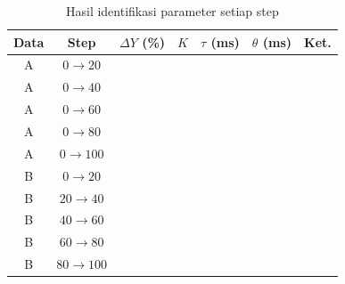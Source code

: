 \documentclass[11pt,a4paper]{article}
\begin{document}
\begin{table}[H]
	\centering
	\caption{Hasil identifikasi parameter setiap step}
	\label{tab:p6_identifikasi}
	\small
	\begin{tabularx}{\textwidth}{|c|c|C|C|C|C|X|}
		\hline
		\textbf{Data} & \textbf{Step} & \textbf{$\Delta Y$ (\%)} & \textbf{$K$} & \textbf{$\tau$ (ms)} & \textbf{$\theta$ (ms)} & \textbf{Ket.} \\
		\hline
		A             & $0 \rightarrow 20$                    &                          &              &                      &                        &                     \\
		A             & $0 \rightarrow 40$                    &                          &              &                      &                        &                     \\
		A             & $0 \rightarrow 60$                    &                          &              &                      &                        &                     \\
		A             & $0 \rightarrow 80$                    &                          &              &                      &                        &                     \\
		A             & $0 \rightarrow 100$                   &                          &              &                      &                        &                     \\
		\hline
		B             & $0 \rightarrow 20$                    &                          &              &                      &                        &                     \\
		B             & $20 \rightarrow 40$                   &                          &              &                      &                        &                     \\
		B             & $40 \rightarrow 60$                   &                          &              &                      &                        &                     \\
		B             & $60 \rightarrow 80$                   &                          &              &                      &                        &                     \\
		B             & $80 \rightarrow 100$                  &                          &              &                      &                        &                     \\
		\hline
	\end{tabularx}
\end{table}
\end{document}
